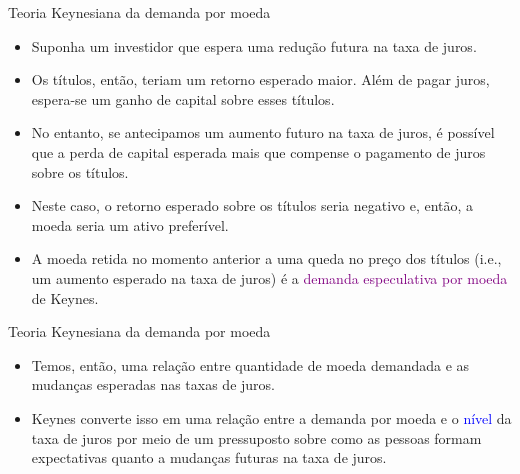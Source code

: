 \documentclass[10pt]{beamer}
\begin{document}
\begin{frame}{Teoria Keynesiana da demanda por moeda}
    \begin{itemize}
        \item Suponha um investidor que espera uma redução futura na taxa de juros.
        \bigskip
        \item Os títulos, então, teriam um retorno esperado maior. Além de pagar juros, espera-se um ganho de capital sobre esses títulos.
        \bigskip
        \item No entanto, se antecipamos um aumento futuro na taxa de juros, é possível que a perda de capital esperada mais que compense o pagamento de juros sobre os títulos.
        \bigskip
        \item Neste caso, o retorno esperado sobre os títulos seria negativo e, então, a moeda seria um ativo preferível.
        \bigskip
        \item A moeda retida no momento anterior a uma queda no preço dos títulos (i.e., um aumento esperado na taxa de juros) é a \textcolor{purple}{demanda especulativa por moeda} de Keynes.
    \end{itemize}
\end{frame}

\begin{frame}{Teoria Keynesiana da demanda por moeda}
    \begin{itemize}
        \item Temos, então, uma relação entre quantidade de moeda demandada e as mudanças esperadas nas taxas de juros.
        \bigskip
        \item Keynes converte isso em uma relação entre a demanda por moeda e o \textcolor{blue}{nível} da taxa de juros por meio de um pressuposto sobre como as pessoas formam expectativas quanto a mudanças futuras na taxa de juros.
    \end{itemize}
\end{frame}
\end{document}
